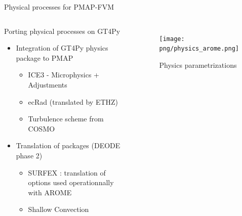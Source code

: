 \documentclass[10pt]{beamer}
\begin{document}
\begin{frame}{Physical processes for PMAP-FVM}
    \begin{columns}
        
        \begin{block}{Porting physical processes on GT4Py}
            \begin{itemize}
                \item \small Integration of GT4Py physics package to PMAP
                \begin{itemize}
                    \item[\faCloudShowersHeavy] \small ICE3 - Microphysics + Adjustments
                    \item[\faIcon{radiation}] ecRad (translated by ETHZ)
                    \item[\faWind] Turbulence scheme from COSMO
                \end{itemize}
                \item \small Translation of packages (DEODE phase 2)
                \begin{itemize}
                    \item \small SURFEX : translation of options used operationnally with AROME
                    \item Shallow Convection
                \end{itemize}
            \end{itemize}
        \end{block}


        \begin{figure}
            \centering
            \texttt{[image: png/physics\_arome.png]}
            \caption{\footnotesize Physics parametrizations}
            \label{fig:appel_arome}
        \end{figure}
    \end{columns}
\end{frame}
\end{document}
